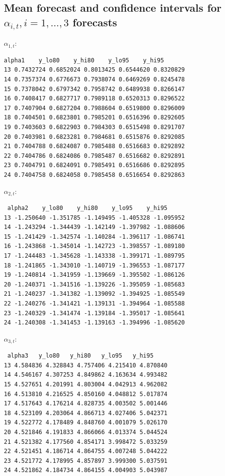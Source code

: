 \subsection{Mean forecast and confidence intervals for $\alpha_{i, t}, i = 1, \ldots, 3$ forecasts}
\label{fcst_ci}

$\alpha_{1, t}$:

\begin{verbatim}
alpha1    y_lo80    y_hi80    y_lo95    y_hi95
13 0.7432724 0.6852024 0.8013425 0.6544620 0.8320829
14 0.7357374 0.6776673 0.7938074 0.6469269 0.8245478
15 0.7378042 0.6797342 0.7958742 0.6489938 0.8266147
16 0.7408417 0.6827717 0.7989118 0.6520313 0.8296522
17 0.7407904 0.6827204 0.7988604 0.6519800 0.8296009
18 0.7404501 0.6823801 0.7985201 0.6516396 0.8292605
19 0.7403603 0.6822903 0.7984303 0.6515498 0.8291707
20 0.7403981 0.6823281 0.7984681 0.6515876 0.8292085
21 0.7404788 0.6824087 0.7985488 0.6516683 0.8292892
22 0.7404786 0.6824086 0.7985487 0.6516682 0.8292891
23 0.7404791 0.6824091 0.7985491 0.6516686 0.8292895
24 0.7404758 0.6824058 0.7985458 0.6516654 0.8292863
\end{verbatim}

$\alpha_{2, t}$:

\begin{verbatim}
 alpha2    y_lo80    y_hi80    y_lo95    y_hi95
13 -1.250640 -1.351785 -1.149495 -1.405328 -1.095952
14 -1.243294 -1.344439 -1.142149 -1.397982 -1.088606
15 -1.241429 -1.342574 -1.140284 -1.396117 -1.086741
16 -1.243868 -1.345014 -1.142723 -1.398557 -1.089180
17 -1.244483 -1.345628 -1.143338 -1.399171 -1.089795
18 -1.241865 -1.343010 -1.140719 -1.396553 -1.087177
19 -1.240814 -1.341959 -1.139669 -1.395502 -1.086126
20 -1.240371 -1.341516 -1.139226 -1.395059 -1.085683
21 -1.240237 -1.341382 -1.139092 -1.394925 -1.085549
22 -1.240276 -1.341421 -1.139131 -1.394964 -1.085588
23 -1.240329 -1.341474 -1.139184 -1.395017 -1.085641
24 -1.240308 -1.341453 -1.139163 -1.394996 -1.085620
\end{verbatim}

$\alpha_{3, t}$:

\begin{verbatim}
 alpha3   y_lo80   y_hi80   y_lo95   y_hi95
13 4.584836 4.328843 4.757406 4.215410 4.870840
14 4.546167 4.307253 4.849862 4.163634 4.993482
15 4.527651 4.201991 4.803004 4.042913 4.962082
16 4.513810 4.216525 4.850160 4.048812 5.017874
17 4.517643 4.176214 4.828735 4.003502 5.001446
18 4.523109 4.203064 4.866713 4.027406 5.042371
19 4.522772 4.178489 4.848760 4.001079 5.026170
20 4.521846 4.191833 4.866066 4.013374 5.044524
21 4.521382 4.177560 4.854171 3.998472 5.033259
22 4.521451 4.186714 4.864755 4.007248 5.044222
23 4.521772 4.178995 4.857897 3.999300 5.037591
24 4.521862 4.184734 4.864155 4.004903 5.043987
\end{verbatim}

